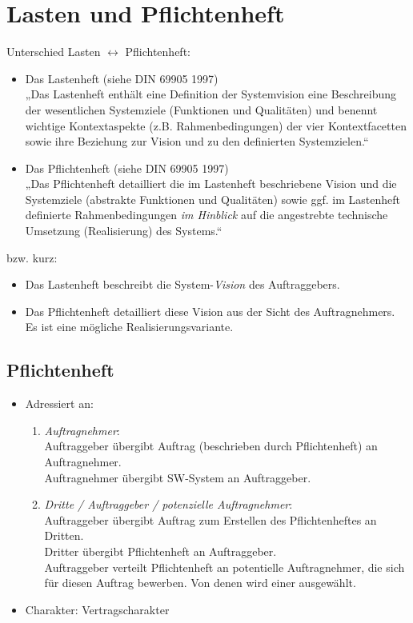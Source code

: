 \chapter{Lasten und Pflichtenheft}


Unterschied Lasten $\leftrightarrow$ Pflichtenheft:
\begin{itemize}
\item Das Lastenheft (siehe DIN 69905 1997)\\
„Das Lastenheft enthält eine Definition der Systemvision eine Beschreibung der wesentlichen Systemziele (Funktionen und Qualitäten) und benennt wichtige Kontextaspekte (z.B. Rahmenbedingungen) der vier Kontextfacetten sowie ihre Beziehung zur Vision und zu den definierten Systemzielen.“
\item Das Pflichtenheft (siehe DIN 69905 1997)\\
„Das Pflichtenheft detailliert die im Lastenheft beschriebene Vision und die Systemziele (abstrakte Funktionen und Qualitäten) sowie ggf. im Lastenheft definierte Rahmenbedingungen \emph{im Hinblick} auf die angestrebte technische Umsetzung (Realisierung) des Systems.“
\end{itemize}
bzw. kurz:
\begin{itemize}
\item Das Lastenheft beschreibt die System-\emph{Vision} des Auftraggebers.
\item Das Pflichtenheft detailliert diese Vision aus der Sicht des Auftragnehmers.\\
Es ist eine mögliche Realisierungsvariante.
\end{itemize}

\section{Pflichtenheft}

\begin{itemize}
\item Adressiert an:
\begin{enumerate}
\item \emph{Auftragnehmer}:\\
Auftraggeber übergibt Auftrag (beschrieben durch Pflichtenheft) an Auftragnehmer.\\
Auftragnehmer übergibt SW-System an Auftraggeber.
\item \emph{Dritte / Auftraggeber / potenzielle Auftragnehmer}:\\
Auftraggeber übergibt Auftrag zum Erstellen des Pflichtenheftes an Dritten.\\
Dritter übergibt Pflichtenheft an Auftraggeber.\\
Auftraggeber verteilt Pflichtenheft an potentielle Auftragnehmer, die sich für diesen Auftrag bewerben. Von denen wird einer ausgewählt.
\end{enumerate}
\item Charakter: 
Vertragscharakter
\end{itemize}

